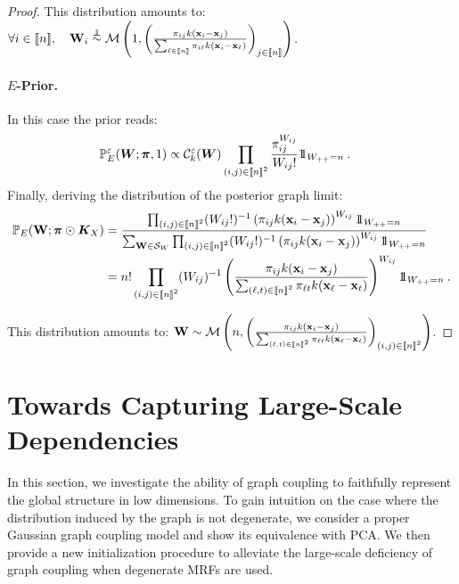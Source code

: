 \begin{proof}
This distribution amounts to: $\forall i \in \integ{n}, \quad \W_{i} \stackrel{\perp\!\!\!\!\perp}{\sim} \mathcal{M}\left(1, \left(\frac{\pi_{ij} k(\mathbf{x}_i - \mathbf{x}_j)}{\sum_{\ell \in \integ{n}} \pi_{i\ell} k(\mathbf{x}_i - \mathbf{x}_{\ell})}\right)_{j \in \integ{n}}\right)$.

\paragraph{$E$-Prior.}
In this case the prior reads:
\begin{align*}
    \mathbb{P}_{E}^{\varepsilon}(\bm{W}; \bm{\pi}, 1) &\propto \mathcal{C}_{k}^{\varepsilon}(\bm{W}) \prod_{(i,j) \in {[\![n]\!]}^2} \frac{\pi_{ij}^{W_{ij}}}{W_{ij}!} 1\!\!1_{W_{++} = n} \:.
\end{align*}
Finally, deriving the distribution of the posterior graph limit:
\begin{align*}
    \mathbb{P}_{E}(\W ;\bm{\pi} \odot \bm{K}_{X}) &= \frac{\prod_{(i,j) \in \integ{n}^2}  (W_{ij}!)^{-1}\left(\pi_{ij} k(\mathbf{x}_i - \mathbf{x}_j)\right)^{W_{ij}} \ind_{W_{++} = n}}{\sum_{\W \in \mathcal{S}_{W}} \prod_{(i,j) \in \integ{n}^2} (W_{ij}!)^{-1} \left(\pi_{ij} k(\mathbf{x}_i - \mathbf{x}_j)\right)^{W_{ij}} \ind_{W_{++} = n}} \\
    &= n! \prod_{(i,j) \in \integ{n}^2} (W_{ij})^{-1} \left(\frac{\pi_{ij} k(\mathbf{x}_i - \mathbf{x}_j)}{\sum_{(\ell,t) \in \integ{n}^2} \pi_{\ell t} k(\mathbf{x}_{\ell} - \mathbf{x}_t)}\right)^{W_{ij}} \ind_{W_{++} = n} \:.
\end{align*}

This distribution amounts to: $\mathbf{W} \sim \mathcal{M}\left(n, \left(\frac{\pi_{ij} k(\mathbf{x}_i - \mathbf{x}_j)}{\sum_{(\ell,t) \in {[\![n]\!]}^2} \pi_{\ell t} k(\mathbf{x}_{\ell} - \mathbf{x}_t)}\right)_{(i,j) \in {[\![n]\!]}^2}\right)$.
\end{proof}


\section{Towards Capturing Large-Scale Dependencies}\label{sec:towards_large_scale}

In this section, we investigate the ability of graph coupling to faithfully represent the global structure in low dimensions. To gain intuition on the case where the distribution induced by the graph is not degenerate, we consider a proper Gaussian graph coupling model and show its equivalence with PCA. We then provide a new initialization procedure to alleviate the large-scale deficiency of graph coupling when degenerate MRFs are used.

